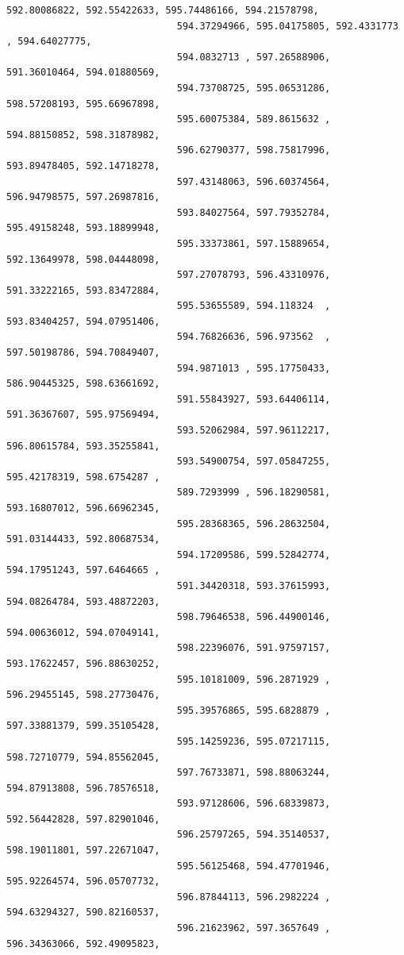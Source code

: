 \documentclass[11pt]{article}
\begin{document}
\begin{Verbatim}[commandchars=\\\{\}]
                              592.80086822, 592.55422633, 595.74486166, 594.21578798,
                              594.37294966, 595.04175805, 592.4331773 , 594.64027775,
                              594.0832713 , 597.26588906, 591.36010464, 594.01880569,
                              594.73708725, 595.06531286, 598.57208193, 595.66967898,
                              595.60075384, 589.8615632 , 594.88150852, 598.31878982,
                              596.62790377, 598.75817996, 593.89478405, 592.14718278,
                              597.43148063, 596.60374564, 596.94798575, 597.26987816,
                              593.84027564, 597.79352784, 595.49158248, 593.18899948,
                              595.33373861, 597.15889654, 592.13649978, 598.04448098,
                              597.27078793, 596.43310976, 591.33222165, 593.83472884,
                              595.53655589, 594.118324  , 593.83404257, 594.07951406,
                              594.76826636, 596.973562  , 597.50198786, 594.70849407,
                              594.9871013 , 595.17750433, 586.90445325, 598.63661692,
                              591.55843927, 593.64406114, 591.36367607, 595.97569494,
                              593.52062984, 597.96112217, 596.80615784, 593.35255841,
                              593.54900754, 597.05847255, 595.42178319, 598.6754287 ,
                              589.7293999 , 596.18290581, 593.16807012, 596.66962345,
                              595.28368365, 596.28632504, 591.03144433, 592.80687534,
                              594.17209586, 599.52842774, 594.17951243, 597.6464665 ,
                              591.34420318, 593.37615993, 594.08264784, 593.48872203,
                              598.79646538, 596.44900146, 594.00636012, 594.07049141,
                              598.22396076, 591.97597157, 593.17622457, 596.88630252,
                              595.10181009, 596.2871929 , 596.29455145, 598.27730476,
                              595.39576865, 595.6828879 , 597.33881379, 599.35105428,
                              595.14259236, 595.07217115, 598.72710779, 594.85562045,
                              597.76733871, 598.88063244, 594.87913808, 596.78576518,
                              593.97128606, 596.68339873, 592.56442828, 597.82901046,
                              596.25797265, 594.35140537, 598.19011801, 597.22671047,
                              595.56125468, 594.47701946, 595.92264574, 596.05707732,
                              596.87844113, 596.2982224 , 594.63294327, 590.82160537,
                              596.21623962, 597.3657649 , 596.34363066, 592.49095823,

\end{Verbatim}
\end{document}
